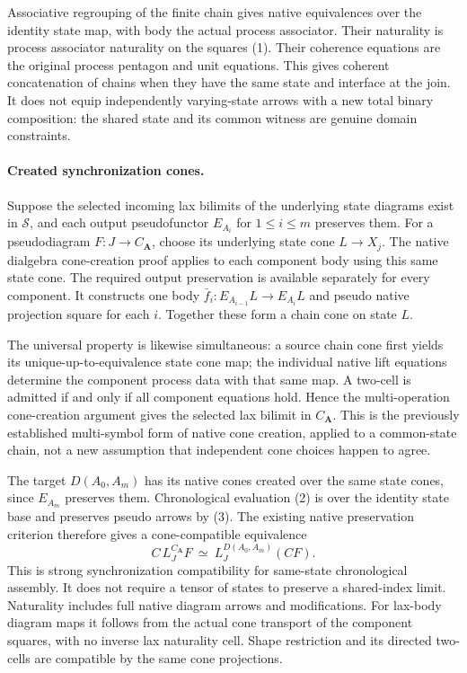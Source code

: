 \documentclass{article}
\begin{document}
Associative regrouping of the finite chain gives native equivalences over the identity state map, with body the actual process associator. Their naturality is process associator naturality on the squares (1). Their coherence equations are the original process pentagon and unit equations. This gives coherent concatenation of chains when they have the same state and interface at the join. It does not equip independently varying-state arrows with a new total binary composition: the shared state and its common witness are genuine domain constraints.

\paragraph{Created synchronization cones.} Suppose the selected incoming lax bilimits of the underlying state diagrams exist in $\mathcal S$, and each output pseudofunctor $E_{A_i}$ for $1\leq i\leq m$ preserves them. For a pseudodiagram $F:J\to C_{\mathbf A}$, choose its underlying state cone $L\to X_j$. The native dialgebra cone-creation proof applies to each component body using this same state cone. The required output preservation is available separately for every component. It constructs one body $\bar f_i:E_{A_{i-1}}L\to E_{A_i}L$ and pseudo native projection square for each $i$. Together these form a chain cone on state $L$.

The universal property is likewise simultaneous: a source chain cone first yields its unique-up-to-equivalence state cone map; the individual native lift equations determine the component process data with that same map. A two-cell is admitted if and only if all component equations hold. Hence the multi-operation cone-creation argument gives the selected lax bilimit in $C_{\mathbf A}$. This is the previously established multi-symbol form of native cone creation, applied to a common-state chain, not a new assumption that independent cone choices happen to agree.

The target $D(A_0,A_m)$ has its native cones created over the same state cones, since $E_{A_m}$ preserves them. Chronological evaluation (2) is over the identity state base and preserves pseudo arrows by (3). The existing native preservation criterion therefore gives a cone-compatible equivalence
\[
 C\,L_J^{C_{\mathbf A}}F\ \simeq\
 L_J^{D(A_0,A_m)}(CF).
\tag{4}
\]
This is strong synchronization compatibility for same-state chronological assembly. It does not require a tensor of states to preserve a shared-index limit. Naturality includes full native diagram arrows and modifications. For lax-body diagram maps it follows from the actual cone transport of the component squares, with no inverse lax naturality cell. Shape restriction and its directed two-cells are compatible by the same cone projections.
\end{document}
